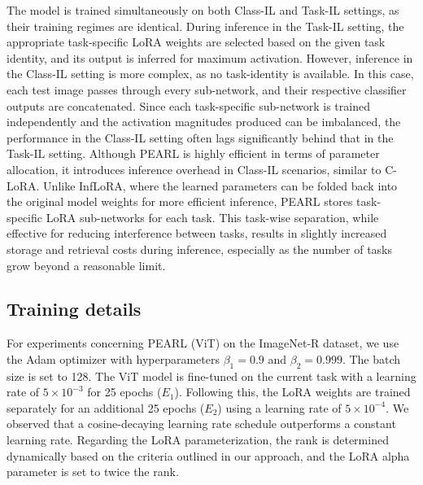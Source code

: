 \documentclass[10pt]{article} %
\begin{document}
 

The model is trained simultaneously on both Class-IL and Task-IL settings, as their training regimes are identical. During inference in the Task-IL setting, the appropriate task-specific LoRA weights are selected based on the given task identity, and its output is inferred for maximum activation. However, inference in the
Class-IL setting is more complex, as no task-identity is available. In this case, each test image passes through every sub-network, and their respective classifier outputs are concatenated. Since each task-specific sub-network is trained independently and the activation magnitudes produced
can be imbalanced, the performance in the Class-IL setting often lags significantly behind that in the
Task-IL setting. Although PEARL is highly efficient in terms of parameter allocation, 
it introduces inference overhead in Class-IL scenarios, similar to C-LoRA. Unlike InfLoRA, where the learned parameters can be folded back into the original model weights for more efficient inference, PEARL stores task-specific LoRA sub-networks for each task. This task-wise separation, while effective for reducing interference between tasks, results in slightly increased storage and retrieval costs during inference, especially as the number of tasks grow beyond a reasonable limit.



\subsection{Training details}\label{appendix:training_details}

For experiments concerning PEARL (ViT) on the ImageNet-R dataset, we use the Adam optimizer \citep{kingma2015adam} with hyperparameters $\beta_{1} = 0.9$ and $\beta_{2} = 0.999$. The batch size is set to 128. The ViT model is fine-tuned on the current task with a learning rate of $5 \times 10^{-3}$ for 25 epochs ($E_1$). Following this, the LoRA weights are trained separately for an additional 25 epochs ($E_2$) using a learning rate of $5 \times 10^{-4}$. We observed that a cosine-decaying learning rate schedule outperforms a constant learning rate. Regarding the LoRA parameterization, the rank is determined dynamically based on the criteria outlined in our approach, and the LoRA alpha parameter is set to twice the rank.
\end{document}
